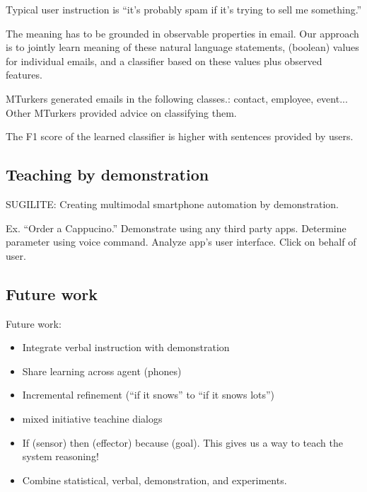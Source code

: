 Typical user instruction is ``it's probably spam if it's trying to sell me something.''

The meaning has to be grounded in observable properties in email. 
Our approach is to jointly learn meaning of these natural language statements, (boolean) values for individual emails, and a classifier based on these values plus observed features.


MTurkers generated emails in the following classes.: contact, employee, event... Other MTurkers provided advice on classifying them.

The F1 score of the learned classifier is higher with sentences provided by users.

\subsection{Teaching by demonstration}

SUGILITE: Creating multimodal smartphone automation by demonstration.

Ex. ``Order a Cappucino.'' Demonstrate using any third party apps. Determine parameter using voice command. Analyze app's user interface. Click on behalf of user.

\subsection{Future work}
Future work:
\begin{itemize}
\item
Integrate verbal instruction with demonstration
\item
Share learning across agent (phones)
\item
Incremental refinement (``if it snows'' to ``if it snows lots'')
\item
mixed initiative teachine dialogs
\item
If (sensor) then (effector) because (goal). This gives us a way to teach the system reasoning!
\item
Combine statistical, verbal, demonstration, and experiments.
\end{itemize}

